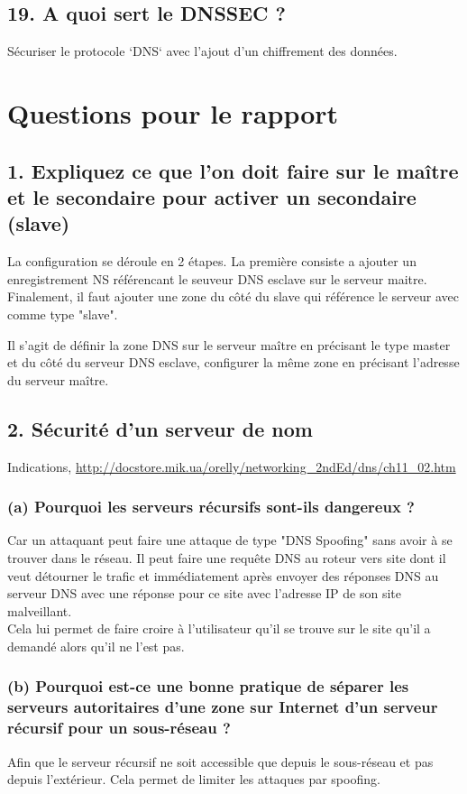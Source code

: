 \documentclass{article}
\begin{document}
\subsection*{19. A quoi sert le DNSSEC ?}
Sécuriser le protocole `DNS` avec l'ajout d'un chiffrement des données.



\section{Questions pour le rapport}
\subsection*{1. Expliquez ce que l’on doit faire sur le maître et le secondaire pour activer un secondaire (slave)}
La configuration se déroule en 2 étapes. La première consiste a ajouter un enregistrement NS référencant le seuveur DNS esclave sur le serveur maitre. Finalement, il faut ajouter une zone du côté du slave qui référence le serveur avec comme type "slave".

Il s'agit de définir la zone DNS sur le serveur maître en précisant le type master et du côté du serveur DNS esclave, configurer la même zone en précisant l'adresse du serveur maître.

\subsection*{2. Sécurité d’un serveur de nom}
Indications,  \url{http://docstore.mik.ua/orelly/networking_2ndEd/dns/ch11_02.htm}

\subsubsection*{(a) Pourquoi les serveurs récursifs sont-ils dangereux ?}
Car un attaquant peut faire une attaque de type "DNS Spoofing" sans avoir à se trouver dans le réseau. Il peut faire une requête DNS au roteur vers site dont il veut détourner le trafic et immédiatement après envoyer des réponses DNS au serveur DNS avec une réponse pour ce site avec l'adresse IP de son site malveillant.\\

Cela lui permet de faire croire à l'utilisateur qu'il se trouve sur le site qu'il a demandé alors qu'il ne l'est pas.

\subsubsection*{(b) Pourquoi est-ce une bonne pratique de séparer les serveurs autoritaires d’une zone sur Internet d’un serveur récursif pour un sous-réseau ?}
Afin que le serveur récursif ne soit accessible que depuis le sous-réseau et pas depuis l'extérieur. Cela permet de limiter les attaques par spoofing.
\end{document}
